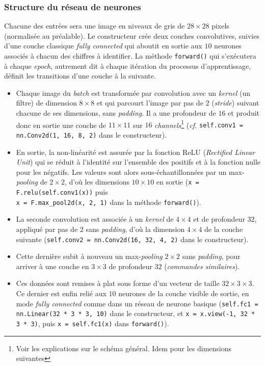 \documentclass[a4paper,11pt]{article} %
\newcommand{\ttt}[1]{\texttt{#1}}
\newcommand{\Py}[1]{\colorbox{gray!20}{\texttt{#1}}}
\begin{document}
\subsubsection{Structure du réseau de neurones}
Chacune des entrées sera une image en niveaux de gris de $28\times28$ pixels (normalisée au préalable). Le constructeur crée deux couches convolutives, suivies d'une couche classique \emph{fully connected} qui aboutit en sortie aux $10$ neurones associés à chacun des chiffres à identifier. La méthode \ttt{forward()} qui s'exécutera à chaque \emph{epoch}, autrement dit à chaque itération du processus d'apprentissage, définit les transitions d'une couche à la suivante.
\begin{itemize}
	\item
	Chaque image du \emph{batch} est transformée par convolution avec un \emph{kernel} (un filtre) de dimension $8\times8$ et qui parcourt l'image par pas de $2$ (\emph{stride}) suivant chacune de ses dimensions, sans \emph{padding}. Il a une profondeur de $16$ et produit donc en sortie une couche de $11\times11$ sur $16$ \emph{channels}\footnote{Voir les explications sur le schéma général. Idem pour les dimensions suivantes}
    (\emph{cf.} \Py{self.conv1 = nn.Conv2d(1, 16, 8, 2)} dans le constructeur).
	\item
	En sortie, la non-linéarité est assurée par la fonction ReLU (\emph{Rectified Linear Unit}) qui se réduit à l'identité sur l'ensemble des positifs et à la fonction nulle pour les négatifs. Les valeurs sont alors sous-échantillonnées par un \og max-\emph{pooling}\fg{} de $2\times2$, d'où les dimensions $10\times10$ en sortie
    (\Py{x = F.relu(self.conv1(x))} puis\\\Py{x = F.max\_pool2d(x, 2, 1)} dans la méthode \ttt{forward()}).
	\item
	La seconde convolution est associée à un \emph{kernel} de $4\times4$ et de profondeur $32$, appliqué par pas de $2$ sans \emph{padding}, d'où la dimension $4\times4$ de la couche suivante (\Py{self.conv2 = nn.Conv2d(16, 32, 4, 2)} dans le constructeur).
	\item
	Cette dernière subit à nouveau un max-\emph{pooling} $2\times2$ sans \emph{padding}, pour arriver à une couche en $3\times3$ de profondeur $32$ (\emph{commandes similaires}).
	\item
	Ces données sont remises \og à plat\fg{} sous forme d'un vecteur de taille $32\times3\times3$. Ce dernier est enfin relié aux $10$ neurones de la couche visible de sortie, en mode \emph{fully connected} comme dans un réseau de neurone basique (\Py{self.fc1 = nn.Linear(32 * 3 * 3, 10)} dans le constructeur, et \Py{x = x.view(-1, 32 * 3 * 3)}, puis \Py{x = self.fc1(x)} dans \ttt{forward()}).
\end{itemize}
\end{document}
